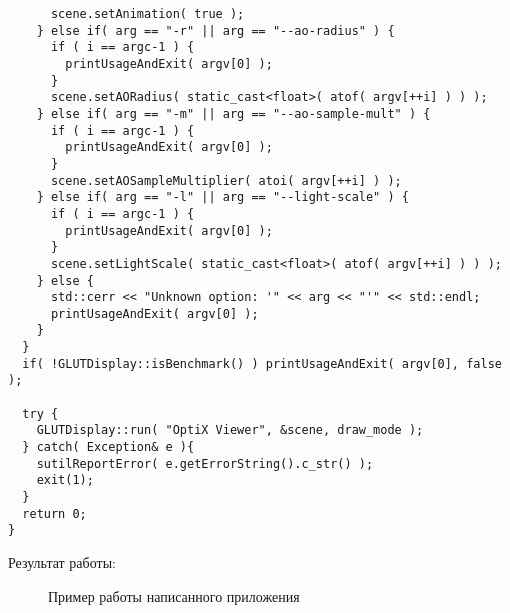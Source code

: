 \begin{verbatim}
      scene.setAnimation( true );
    } else if( arg == "-r" || arg == "--ao-radius" ) {
      if ( i == argc-1 ) {
        printUsageAndExit( argv[0] );
      }
      scene.setAORadius( static_cast<float>( atof( argv[++i] ) ) );
    } else if( arg == "-m" || arg == "--ao-sample-mult" ) {
      if ( i == argc-1 ) {
        printUsageAndExit( argv[0] );
      }
      scene.setAOSampleMultiplier( atoi( argv[++i] ) );
    } else if( arg == "-l" || arg == "--light-scale" ) {
      if ( i == argc-1 ) {
        printUsageAndExit( argv[0] );
      }
      scene.setLightScale( static_cast<float>( atof( argv[++i] ) ) );
    } else {
      std::cerr << "Unknown option: '" << arg << "'" << std::endl;
      printUsageAndExit( argv[0] );
    }
  }  
  if( !GLUTDisplay::isBenchmark() ) printUsageAndExit( argv[0], false );

  try {
    GLUTDisplay::run( "OptiX Viewer", &scene, draw_mode );
  } catch( Exception& e ){
    sutilReportError( e.getErrorString().c_str() );
    exit(1);
  }
  return 0;
}
\end{verbatim}

Результат работы:
\begin{figure}[h!]
\caption{\small{Пример работы написанного приложения}}
\label{map}
\end{figure}